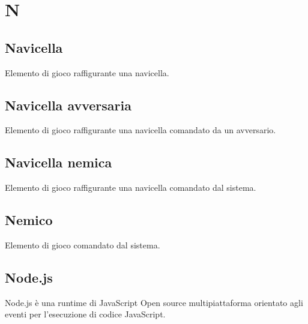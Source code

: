 \section{N}
    \subsection{Navicella}
        Elemento di gioco raffigurante una navicella.
    \subsection{Navicella avversaria}
        Elemento di gioco raffigurante una navicella comandato da un avversario.
    \subsection{Navicella nemica}
        Elemento di gioco raffigurante una navicella comandato dal sistema.
    \subsection{Nemico}
        Elemento di gioco comandato dal sistema.
	\subsection{Node.js} 
		Node.js è una runtime di JavaScript Open source multipiattaforma orientato agli eventi per l'esecuzione di codice JavaScript.


\newpage